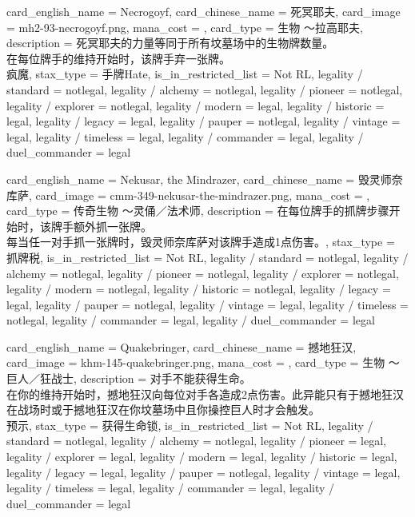 \documentclass[lang = cn, color = black, 10pt]{AllThatStax}
\begin{document}
\card
{
	card_english_name = {Necrogoyf},
	card_chinese_name = {死冥耶夫},
	card_image = mh2-93-necrogoyf.png,
	mana_cost = ,
	card_type = 生物 ～拉高耶夫,
	description = {死冥耶夫的力量等同于所有坟墓场中的生物牌数量。\\
		在每位牌手的维持开始时，该牌手弃一张牌。\\
		疯魔},
	stax_type = 手牌Hate,
	is_in_restricted_list = Not RL,
	legality / standard = notlegal,
	legality / alchemy = notlegal,
	legality / pioneer = notlegal,
	legality / explorer = notlegal,
	legality / modern = legal,
	legality / historic = legal,
	legality / legacy = legal,
	legality / pauper = notlegal,
	legality / vintage = legal,
	legality / timeless = legal,
	legality / commander = legal,
	legality / duel_commander = legal
}

\card
{
	card_english_name = {Nekusar, the Mindrazer},
	card_chinese_name = {毁灵师奈库萨},
	card_image = cmm-349-nekusar-the-mindrazer.png,
	mana_cost = ,
	card_type = 传奇生物 ～灵俑／法术师,
	description = {在每位牌手的抓牌步骤开始时，该牌手额外抓一张牌。\\
		每当任一对手抓一张牌时，毁灵师奈库萨对该牌手造成1点伤害。},
	stax_type = 抓牌税,
	is_in_restricted_list = Not RL,
	legality / standard = notlegal,
	legality / alchemy = notlegal,
	legality / pioneer = notlegal,
	legality / explorer = notlegal,
	legality / modern = notlegal,
	legality / historic = notlegal,
	legality / legacy = legal,
	legality / pauper = notlegal,
	legality / vintage = legal,
	legality / timeless = notlegal,
	legality / commander = legal,
	legality / duel_commander = legal
}

\card
{
	card_english_name = {Quakebringer},
	card_chinese_name = {撼地狂汉},
	card_image = khm-145-quakebringer.png,
	mana_cost = ,
	card_type = 生物 ～巨人／狂战士,
	description = {对手不能获得生命。\\
		在你的维持开始时，撼地狂汉向每位对手各造成2点伤害。此异能只有于撼地狂汉在战场时或于撼地狂汉在你坟墓场中且你操控巨人时才会触发。\\
		预示},
	stax_type = 获得生命锁,
	is_in_restricted_list = Not RL,
	legality / standard = notlegal,
	legality / alchemy = notlegal,
	legality / pioneer = legal,
	legality / explorer = legal,
	legality / modern = legal,
	legality / historic = legal,
	legality / legacy = legal,
	legality / pauper = notlegal,
	legality / vintage = legal,
	legality / timeless = legal,
	legality / commander = legal,
	legality / duel_commander = legal
}
\end{document}
